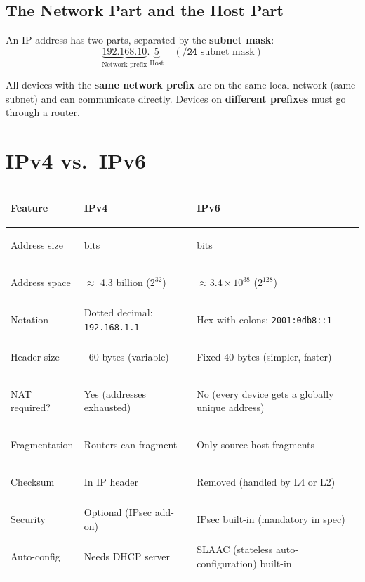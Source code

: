 \documentclass[11pt, letterpaper]{article}
\begin{document}
\subsection*{The Network Part and the Host Part}

An IP address has two parts, separated by the \textbf{subnet mask}:
\[
  \underbrace{192.168.10}_{\text{Network prefix}} . \underbrace{5}_{\text{Host}}
  \quad (\texttt{/24} \text{ subnet mask})
\]

All devices with the \textbf{same network prefix} are on the same local network (same subnet)
and can communicate directly. Devices on \textbf{different prefixes} must go through a router.

\section*{IPv4 vs.\ IPv6}

\noindent
{\renewcommand{\arraystretch}{1.6}
\begin{tabularx}{\textwidth}{>{\bfseries\raggedright\arraybackslash}p{4cm}
                              >{\raggedright\arraybackslash}X
                              >{\raggedright\arraybackslash}X}
\toprule
\rowcolor{tableheader}
\textbf{Feature} & \textbf{IPv4} & \textbf{IPv6} \\
\midrule
\rowcolor{rowA}  Address size    & 32 bits & 128 bits \\
\rowcolor{rowB}  Address space   & $\approx$ 4.3 billion ($2^{32}$) & $\approx 3.4 \times 10^{38}$ ($2^{128}$) \\
\rowcolor{rowA}  Notation        & Dotted decimal: \texttt{192.168.1.1} & Hex with colons: \texttt{2001:0db8::1} \\
\rowcolor{rowB}  Header size     & 20--60 bytes (variable) & Fixed 40 bytes (simpler, faster) \\
\rowcolor{rowA}  NAT required?   & Yes (addresses exhausted) & No (every device gets a globally unique address) \\
\rowcolor{rowB}  Fragmentation   & Routers can fragment & Only source host fragments \\
\rowcolor{rowA}  Checksum        & In IP header & Removed (handled by L4 or L2) \\
\rowcolor{rowB}  Security        & Optional (IPsec add-on) & IPsec built-in (mandatory in spec) \\
\rowcolor{rowA}  Auto-config     & Needs DHCP server & SLAAC (stateless auto-configuration) built-in \\
\bottomrule
\end{tabularx}}
\end{document}
